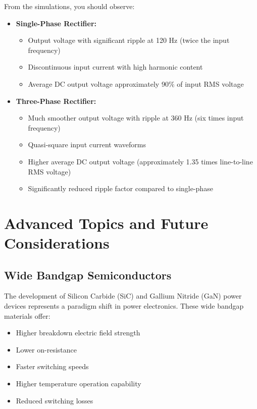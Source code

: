 \documentclass[12pt,a4paper]{article}
\begin{document}
From the simulations, you should observe:

\begin{itemize}
    \item \textbf{Single-Phase Rectifier:}
    \begin{itemize}
        \item Output voltage with significant ripple at 120 Hz (twice the input frequency)
        \item Discontinuous input current with high harmonic content
        \item Average DC output voltage approximately 90\% of input RMS voltage
    \end{itemize}
    
    \item \textbf{Three-Phase Rectifier:}
    \begin{itemize}
        \item Much smoother output voltage with ripple at 360 Hz (six times input frequency)
        \item Quasi-square input current waveforms
        \item Higher average DC output voltage (approximately 1.35 times line-to-line RMS voltage)
        \item Significantly reduced ripple factor compared to single-phase
    \end{itemize}
\end{itemize}

\section{Advanced Topics and Future Considerations}

\subsection{Wide Bandgap Semiconductors}

The development of Silicon Carbide (SiC) and Gallium Nitride (GaN) power devices represents a paradigm shift in power electronics. These wide bandgap materials offer:

\begin{itemize}
    \item Higher breakdown electric field strength
    \item Lower on-resistance
    \item Faster switching speeds
    \item Higher temperature operation capability
    \item Reduced switching losses
\end{itemize}
\end{document}
